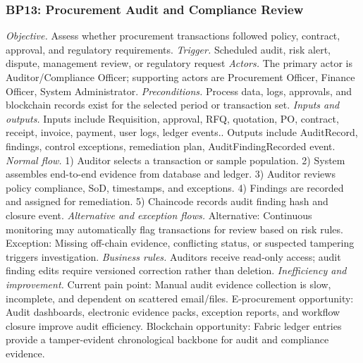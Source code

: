 \documentclass[conference]{IEEEtran}
\begin{document}
\subsubsection{BP13: Procurement Audit and Compliance Review}
\textit{Objective.} Assess whether procurement transactions followed policy, contract, approval, and regulatory requirements.
\textit{Trigger.} Scheduled audit, risk alert, dispute, management review, or regulatory request
\textit{Actors.} The primary actor is Auditor/Compliance Officer; supporting actors are Procurement Officer, Finance Officer, System Administrator.
\textit{Preconditions.} Process data, logs, approvals, and blockchain records exist for the selected period or transaction set.
\textit{Inputs and outputs.} Inputs include Requisition, approval, RFQ, quotation, PO, contract, receipt, invoice, payment, user logs, ledger events.. Outputs include AuditRecord, findings, control exceptions, remediation plan, AuditFindingRecorded event.
\textit{Normal flow.} 1) Auditor selects a transaction or sample population. 2) System assembles end-to-end evidence from database and ledger. 3) Auditor reviews policy compliance, SoD, timestamps, and exceptions. 4) Findings are recorded and assigned for remediation. 5) Chaincode records audit finding hash and closure event.
\textit{Alternative and exception flows.} Alternative: Continuous monitoring may automatically flag transactions for review based on risk rules. Exception: Missing off-chain evidence, conflicting status, or suspected tampering triggers investigation.
\textit{Business rules.} Auditors receive read-only access; audit finding edits require versioned correction rather than deletion.
\textit{Inefficiency and improvement.} Current pain point: Manual audit evidence collection is slow, incomplete, and dependent on scattered email/files. E-procurement opportunity: Audit dashboards, electronic evidence packs, exception reports, and workflow closure improve audit efficiency. Blockchain opportunity: Fabric ledger entries provide a tamper-evident chronological backbone for audit and compliance evidence.
\end{document}
